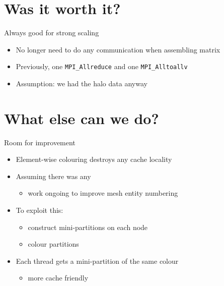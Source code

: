 \documentclass[bigger]{beamer}
\begin{document}
\section{Was it worth it?}
\label{sec:orgheadline30}
\begin{frame}[fragile,label={sec:orgheadline29}]{Always good for strong scaling}
 \begin{itemize}
\item No longer need to do any communication when assembling matrix
\item Previously, one \texttt{MPI\_Allreduce} and one \texttt{MPI\_Alltoallv}
\item Assumption: we had the halo data anyway
\end{itemize}

\begin{center}
\end{center}
\end{frame}
\section{What else can we do?}
\label{sec:orgheadline32}
\begin{frame}[label={sec:orgheadline31}]{Room for improvement}
\begin{itemize}
\item Element-wise colouring destroys any cache locality
\item Assuming there was any
\begin{itemize}
\item work ongoing to improve mesh entity numbering
\end{itemize}
\item To exploit this:
\begin{itemize}
\item construct mini-partitions on each node
\item colour partitions
\end{itemize}
\item Each thread gets a mini-partition of the same colour
\begin{itemize}
\item more cache friendly
\end{itemize}
\end{itemize}
\end{frame}
\end{document}
